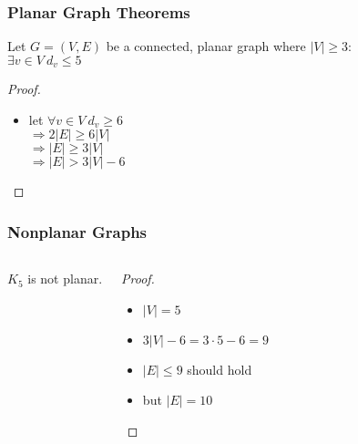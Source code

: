 \documentclass[dvipsnames]{beamer}
\begin{document}
\begin{frame}
  \frametitle{Planar Graph Theorems}

  \begin{theorem}
    Let $G=(V,E)$ be a connected, planar graph where $|V| \geq 3$:\\
    $\exists v \in V~d_v \leq 5$
  \end{theorem}

  \pause
  \begin{proof}
    \begin{itemize}
      \item let $\forall v \in V~d_v \geq 6$\\
        \pause
        $\Rightarrow 2 |E| \geq 6 |V|$\\
        \pause
        $\Rightarrow |E| \geq 3 |V|$\\
        \pause
        $\Rightarrow |E| > 3 |V| - 6$
    \end{itemize}
  \end{proof}
\end{frame}

\begin{frame}
  \frametitle{Nonplanar Graphs}

  \begin{columns}
    \begin{theorem}
      $K_5$ is not planar.

      \medskip
      \begin{center}
      \end{center}
    \end{theorem}

    \pause
    \begin{proof}
      \begin{itemize}
        \item $|V| = 5$

        \pause
        \item $3 |V| - 6 = 3 \cdot 5 - 6 = 9$

        \pause
        \item $|E| \leq 9$ should hold

        \pause
        \item but $|E| = 10$
      \end{itemize}
    \end{proof}
  \end{columns}
\end{frame}
\end{document}
